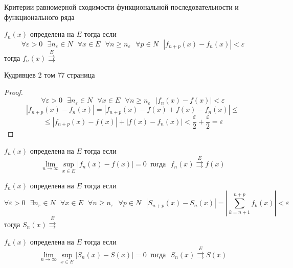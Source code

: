 \begin{title}[\Large]
  Критерии равномерной сходимости функциональной последовательности и
  функционального ряда
\end{title}

\begin{block}
  $f_n(x)$ определена на $E$ тогда если
  $$
  \forall \varepsilon > 0 ~~~ \exists n_{\varepsilon} \in N ~~~
  \forall x \in E ~~~ \forall n \ge n_{\varepsilon} ~~~ \forall p \in N ~~~
  |f_{n+p}(x) - f_n(x)| < \varepsilon
  $$
  тогда $f_n(x) \stackrel{E}{\rightrightarrows}$

  Кудрявцев 2 том 77 страница
\end{block}

\begin{proof}
  $$
  \forall \varepsilon > 0 ~~~ \exists n_{\varepsilon} \in N ~~~
  \forall x \in E ~~~ \forall n \ge n_{\varepsilon} ~~~
  |f_n(x) - f(x)| < \varepsilon
  $$
  $$
  |f_{n+p}(x) - f_n(x)| = |f_{n+p}(x) - f(x) + f(x) - f_n(x)| \le
  $$
  $$
  \le |f_{n+p}(x) - f(x)| + |f(x) - f_n(x)| < \frac{\varepsilon}{2} +
  \frac{\varepsilon}{2} = \varepsilon
  $$
\end{proof}

\begin{block}
  $f_n(x)$ определена на $E$ тогда если
  $$
  \lim_{n \to \infty} \sup\limits_{x \in E} |f_n(x) - f(x)| = 0 ~~ \text{тогда}
  ~~~ f_n(x) \stackrel{E}{\rightrightarrows} f(x)
  $$
\end{block}

\begin{block}
  $f_n(x)$ определена на $E$ тогда если
  $$
  \forall \varepsilon > 0 ~~~ \exists n_{\varepsilon} \in N ~~~
  \forall x \in E ~~~ \forall n \ge n_{\varepsilon} ~~~ \forall p \in N ~~~
  |S_{n+p}(x) - S_n(x)| = \left| \sum_{k = n + 1}^{n+p} f_k(x) \right|
  < \varepsilon
  $$
  тогда $S_n(x) \stackrel{E}{\rightrightarrows}$
\end{block}

\begin{block}
  $f_n(x)$ определена на $E$ тогда если
  $$
  \lim_{n \to \infty} \sup\limits_{x \in E} |S_n(x) - S(x)| = 0 ~~ \text{тогда}
  ~~~ S_n(x) \stackrel{E}{\rightrightarrows} S(x)
  $$
\end{block}

